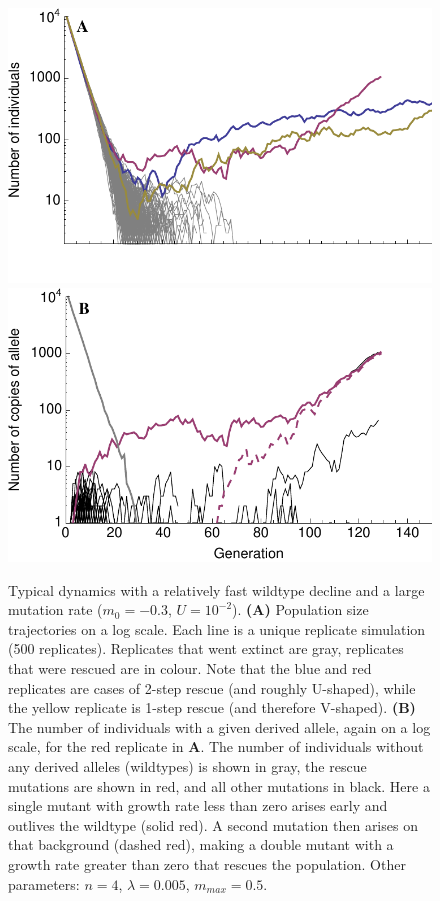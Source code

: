 \documentclass[9pt,twocolumn,twoside,lineno]{gsajnl}
\begin{document}
\begin{figure}[!h]
\centering
\includegraphics[width=\linewidth]{../IMAGES/Ushape.pdf}\\
\includegraphics[width=\linewidth]{../IMAGES/UshapeMutations.pdf}
\caption{
Typical dynamics with a relatively fast wildtype decline and a large mutation rate ($m_0 = -0.3$, $U=10^{-2}$).
\textbf{(A)} Population size trajectories on a log scale.
Each line is a unique replicate simulation (500 replicates).
Replicates that went extinct are gray, replicates that were rescued are in colour.
Note that the blue and red replicates are cases of 2-step rescue (and roughly U-shaped), while the yellow replicate is 1-step rescue (and therefore V-shaped).
\textbf{(B)} The number of individuals with a given derived allele, again on a log scale, for the red replicate in \textbf{A}.
The number of individuals without any derived alleles (wildtypes) is shown in gray, the rescue mutations are shown in red, and all other mutations in black.
Here a single mutant with growth rate less than zero arises early and outlives the wildtype (solid red).
A second mutation then arises on that background (dashed red), making a double mutant with a growth rate greater than zero that rescues the population. 
Other parameters: $n=4$, $\lambda=0.005$, $m_{max}=0.5$.
}%
\label{fig:Ushape}
\end{figure}
\end{document}

